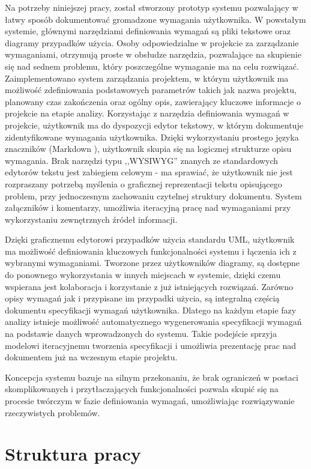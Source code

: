       Na potrzeby niniejszej pracy, został stworzony prototyp systemu pozwalający w łatwy sposób dokumentować gromadzone wymagania użytkownika. W powstałym systemie, głównymi narzędziami definiowania wymagań są pliki tekstowe oraz diagramy przypadków użycia. Osoby odpowiedzialne w projekcie za zarządzanie wymaganiami, otrzymują proste w obsłudze narzędzia, pozwalające na skupienie się nad sednem problemu, który poszczególne wymaganie ma na celu rozwiązać. Zaimplementowano system zarządzania projektem, w którym użytkownik ma możliwość zdefiniowania podstawowych parametrów takich jak nazwa projektu, planowany czas zakończenia oraz ogólny opis, zawierający kluczowe informacje o projekcie na etapie analizy. Korzystając z narzędzia definiowania wymagań w projekcie, użytkownik ma do dyspozycji edytor tekstowy, w którym dokumentuje zidentyfikowane wymagania użytkownika. Dzięki wykorzystaniu prostego języka znaczników (Markdown \cite{Grub04}), użytkownik skupia się na logicznej strukturze opisu wymagania. Brak narzędzi typu ,,WYSIWYG'' znanych ze standardowych edytorów tekstu jest zabiegiem celowym - ma sprawiać, że użytkownik nie jest rozpraszany potrzebą myślenia o graficznej reprezentacji tekstu opisującego problem, przy jednoczesnym zachowaniu czytelnej struktury dokumentu. System załączników i komentarzy, umożliwia iteracyjną pracę nad wymaganiami przy wykorzystaniu zewnętrznych źródeł informacji. 

      Dzięki graficznemu edytorowi przypadków użycia standardu UML, użytkownik ma możliwość definiowania kluczowych funkcjonalności systemu i łączenia ich z wybranymi wymaganiami. Tworzone przez użytkowników diagramy, są dostępne do ponownego wykorzystania w innych miejscach w systemie, dzięki czemu wspierana jest kolaboracja i korzystanie z już istniejących rozwiązań. Zarówno opisy wymagań jak i przypisane im przypadki użycia, są integralną częścią dokumentu specyfikacji wymagań użytkownika. Dlatego na każdym etapie fazy analizy istnieje możliwość automatycznego wygenerowania specyfikacji wymagań na podstawie danych wprowadzonych do systemu. Takie podejście sprzyja modelowi iteracyjnemu tworzenia specyfikacji i umożliwia prezentację prac nad dokumentem już na wczesnym etapie projektu. 

      Koncepcja systemu bazuje na silnym przekonaniu, że brak ograniczeń w postaci skomplikowanych i przytłaczających funkcjonalności pozwala skupić się na procesie twórczym w fazie definiowania wymagań, umożliwiając rozwiązywanie rzeczywistych problemów. 

    \section{Struktura pracy}

